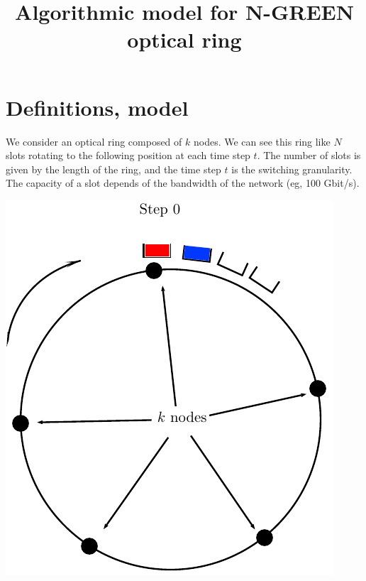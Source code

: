 \documentclass[a4paper,10pt]{article}
\title{Algorithmic model for N-GREEN optical ring}
\begin{document}
\maketitle

\section*{Definitions, model}
We consider an optical ring composed of $k$ nodes. We can see this ring like $N$ slots rotating to the following position at each time step $t$. The number of slots is given by the length of the ring, and the time step $t$ is the switching granularity. The capacity of a slot depends of the bandwidth of the network (eg, 100 Gbit/s).
\begin{center}   

      \includegraphics[scale=0.5]{anneau1.pdf}
      \hspace{3cm}

\end{center}
\end{document}
